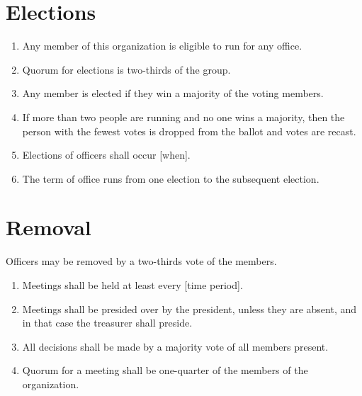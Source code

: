 \documentclass[12pt]{article}
\begin{document}
\section{Elections}
\begin{enumerate}
    \item Any member of this organization is eligible to run for any office.
    \item Quorum for elections is two-thirds of the group.
    \item Any member is elected if they win a majority of the voting members.
    \item If more than two people are running and no one wins a majority, then the person with the fewest votes is dropped from the ballot and votes are recast.
    
    \item Elections of officers shall occur [when].

    \item The term of office runs from one election to the subsequent election.
\end{enumerate}

\section{Removal}
Officers may be removed by a two-thirds vote of the members.

\begin{enumerate}
    \item Meetings shall be held at least every [time period].

    \item Meetings shall be presided over by the president, unless they are absent, and in that case the treasurer shall preside.

    \item All decisions shall be made by a majority vote of all members present.
    \item Quorum for a meeting shall be one-quarter of the members of the organization.
\end{enumerate}
\end{document}
